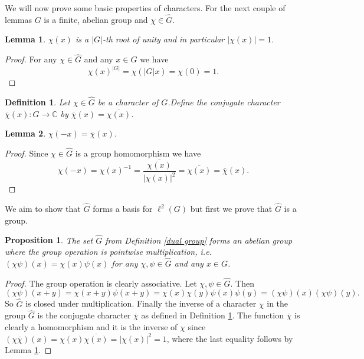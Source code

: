 \documentclass[12pt]{article}
\newtheorem{Definition}{Definition}
\newtheorem{Proposition}{Proposition}
\newtheorem{Lemma}{Lemma}
\newcommand{\C}{\mathbb{C}}
\begin{document}
We will now prove some basic properties of  characters.
For the next couple of lemmas $G$ is a finite, abelian group and $\chi \in \widehat{G}$.

\begin{Lemma} \label{root of unity}
    $\chi(x)$ is a $|G|$-th root of unity and in particular $|\chi(x)|=1$.
\end{Lemma}
\begin{proof}
    For any $\chi\in \widehat{G}$ and any $x\in G$ we have
    \[
        \chi(x)^{|G|} = \chi(|G|x) = \chi(0) = 1.
    \]
\end{proof}

\begin{Definition} \label{conjugate character}
    Let $\chi\in \widehat{G}$ be a character of $G$.Define the conjugate character $\overline{\chi}(x):G\to \C$ by $\overline{\chi}(x)=\overline{\chi(x)}$.
\end{Definition}

\begin{Lemma}
    $\chi(-x) = \overline{\chi}(x)$.
\end{Lemma}
\begin{proof}
    Since $\chi \in \widehat{G}$ is a group homomorphism we have
    \[
        \chi(-x)
        = \chi(x)^{-1}
        = \frac{\overline{\chi(x)}}{|\chi(x)|^2}
        = \overline{\chi(x)}
        = \overline{\chi}(x).
    \]
\end{proof}

We aim to show that $\widehat{G}$ forms a basis for $\ell^2(G)$ but first we prove that $\widehat{G}$ is a group.

\begin{Proposition} \label{charactersaregroup} %
    The set $\widehat{G}$ from Definition \ref{dual group} forms an abelian group where the group operation is pointwise multiplication, i.e. $(\chi\psi)(x) = \chi(x)\psi(x)$ for any $\chi, \psi\in \widehat{G}$ and any $x\in G$.
\end{Proposition}
\begin{proof}
    The group operation is clearly associative.
    Let $\chi, \psi\in \widehat{G}$.
    Then $(\chi\psi)(x+y) = \chi(x+y)\psi(x+y) = \chi(x)\chi(y)\psi(x)\psi(y)= (\chi\psi)(x)(\chi\psi)(y).$
    So $\widehat{G}$ is closed under multiplication.
    Finally the inverse of a character $\chi$ in the group $\widehat{G}$ is the conjugate character  $\overline{\chi}$ as defined in Definition \ref{conjugate character}.
    The function $\overline{\chi}$ is clearly a homomorphism and it is the inverse of $\chi$ since $(\chi\overline{\chi})(x)=\chi(x)\overline{\chi(x)} = |\chi(x)|^2=1$, where the last equality follows by Lemma \ref{root of unity}.
\end{proof}
\end{document}
